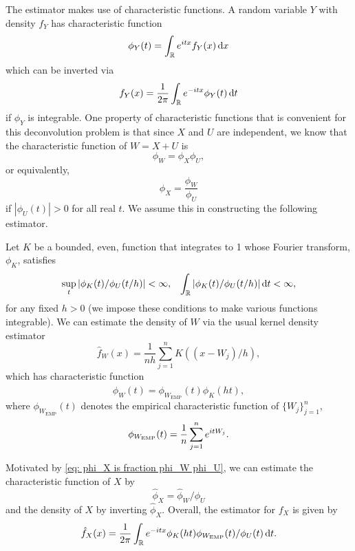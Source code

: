 	The estimator makes use of characteristic functions. A random variable $Y$ with density $f_Y$ has characteristic function
	\begin{equation}
		\phi_Y(t) = \int_\mathbb{R} e^{i t x} f_Y(x) \, \mathrm{d} x
	\end{equation}
	which can be inverted via
	\begin{equation}
		f_Y(x) = \frac{1}{2\pi} \int_\mathbb{R} e^{-itx} \phi_Y(t) \, \mathrm{d} t
	\end{equation}
	if $\phi_Y$ is integrable. One property of characteristic functions that is convenient for this deconvolution problem is that since $X$ and $U$ are independent, we know that the characteristic function of $W = X+ U$ is
	\begin{equation}
		\phi_W = \phi_X \phi_U,
	\end{equation}
	or equivalently,
	\begin{equation}
		\phi_X = \frac{\phi_W}{\phi_U}
		\label{eq: phi_X is fraction phi_W phi_U}
	\end{equation}
	if $|\phi_U(t)| > 0$ for all real $t$. We assume this in constructing the following estimator.

	Let $K$ be a bounded, even, function that integrates to 1 whose Fourier transform, $\phi_K$, satisfies
	\begin{align}
		\sup_t |\phi_K(t) / \phi_U(t / h) | < \infty, &&\int_\mathbb{R} |\phi_K(t) / \phi_U(t / h)| \, \mathrm{d} t < \infty,
		\label{eq:phiK conditions error known}
	\end{align}
	for any fixed $h > 0$ (we impose these conditions to make various functions integrable). We can estimate the density of $W$ via the usual kernel density estimator \cite[Section 20.3]{Wasserman2003-ot}
	\begin{equation}
		\hat{f}_W(x) = \frac{1}{n h} \sum_{j = 1}^n K((x - W_j)/h),
		\label{eq:standard KDE}
	\end{equation}
	which has characteristic function
	\begin{equation}
		\hat{\phi}_W(t) = \phi_{W_\mathrm{EMP}}(t) \phi_K(h t),
	\end{equation}
	where $\phi_{W_\mathrm{EMP}}(t)$ denotes the empirical characteristic function of $\{W_j\}_{j = 1}^n$,
	\begin{equation}
		\phi_{W_\mathrm{EMP}}(t) = \frac{1}{n}\sum_{j = 1}^n e^{itW_j}.
	\end{equation}

	Motivated by \eqref{eq: phi_X is fraction phi_W phi_U}, we can estimate the characteristic function of $X$ by 
	\begin{equation}
		\hat{\phi}_X = \hat{\phi}_W / \phi_U
	\end{equation}
	and the density of $X$ by inverting $\hat{\phi}_X$. Overall, the estimator for $f_X$ is given by
	\begin{equation}
	\label{eq:standard deconvolution estimator}
		\hat{f}_X(x) = \frac{1}{2\pi} \int_\mathbb{R} e^{-itx} \phi_K(ht) \phi_{W_\mathrm{EMP}}(t)  / \phi_U(t) \, \mathrm{d} t.
	\end{equation}

